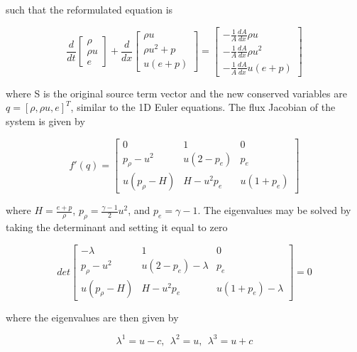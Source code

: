 \documentclass{article}%
\numberwithin{equation}{section}
\begin{document}
such that the reformulated equation is 

\begin{equation}
\frac{d}{dt} \left[ \begin{array}{c} \rho  \\ \rho u  \\ e \end{array} \right] + \frac{d}{dx} \left[ \begin{array}{c} \rho u  \\ \rho u^2 + p \\ u(e + p) \end{array} \right] = \left[ \begin{array}{c} -\frac{1}{A}\frac{dA}{dx} \rho u \\ -\frac{1}{A} \frac{dA}{dx} \rho u^2  \\ -\frac{1}{A} \frac{dA}{dx}  u(e + p) \end{array} \right]
\end{equation}

where S is the original source term vector and the new conserved variables are $q = [\rho, \rho u, e]^T$, similar to the 1D Euler equations. The flux Jacobian of the system is given by

\begin{equation}
f'(q) = \left[ \begin{array}{ccc} 0 & 1 & 0 \\ p_{\rho} - u^2 &  u(2 - p_e) &  p_e \\  u(p_\rho - H) & H - u^2 p_e  &  u(1 + p_e) \end{array} \right] \label{1deulerjacobian}
\end{equation}

where $H = \frac{e + p}{\rho}$, $p_\rho = \frac{\gamma - 1}{2} u^2 $, and $p_e = \gamma - 1$. The eigenvalues may be solved by taking the determinant and setting it equal to zero

\begin{equation}
det \left[ \begin{array}{ccc} -\lambda & 1 & 0 \\ p_{\rho} - u^2 &  u(2 - p_e) - \lambda &  p_e \\  u(p_\rho - H) & H - u^2 p_e  &  u(1 + p_e) - \lambda \end{array} \right] = 0
\end{equation}

where the eigenvalues are then given by 

\begin{equation}
\lambda^1 = u - c,  \ \ \lambda^2 =u , \ \ \lambda^3 = u + c \label{eigval}
\end{equation}
\end{document}
